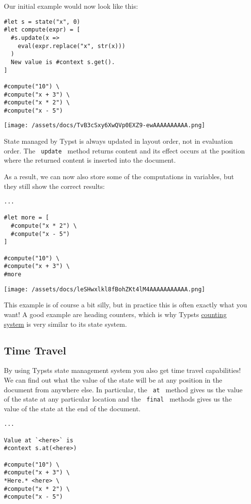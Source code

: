 Our initial example would now look like this:

\begin{verbatim}
#let s = state("x", 0)
#let compute(expr) = [
  #s.update(x =>
    eval(expr.replace("x", str(x)))
  )
  New value is #context s.get().
]

#compute("10") \
#compute("x + 3") \
#compute("x * 2") \
#compute("x - 5")
\end{verbatim}

\texttt{[image: /assets/docs/TvB3cSxy6XwQVp0EXZ9-ewAAAAAAAAAA.png]}

State managed by Typst is always updated in layout order, not in
evaluation order. The \texttt{\ update\ } method returns content and its
effect occurs at the position where the returned content is inserted
into the document.

As a result, we can now also store some of the computations in
variables, but they still show the correct results:

\begin{verbatim}
...

#let more = [
  #compute("x * 2") \
  #compute("x - 5")
]

#compute("10") \
#compute("x + 3") \
#more
\end{verbatim}

\texttt{[image: /assets/docs/leSHwxlkl8fBohZKt4lM4AAAAAAAAAAA.png]}

This example is of course a bit silly, but in practice this is often
exactly what you want! A good example are heading counters, which is why
Typst\textquotesingle s
\href{/docs/reference/introspection/counter/}{counting system} is very
similar to its state system.

\subsection{Time Travel}\label{time-travel}

By using Typst\textquotesingle s state management system you also get
time travel capabilities! We can find out what the value of the state
will be at any position in the document from anywhere else. In
particular, the \texttt{\ at\ } method gives us the value of the state
at any particular location and the \texttt{\ final\ } methods gives us
the value of the state at the end of the document.

\begin{verbatim}
...

Value at `<here>` is
#context s.at(<here>)

#compute("10") \
#compute("x + 3") \
*Here.* <here> \
#compute("x * 2") \
#compute("x - 5")
\end{verbatim}


